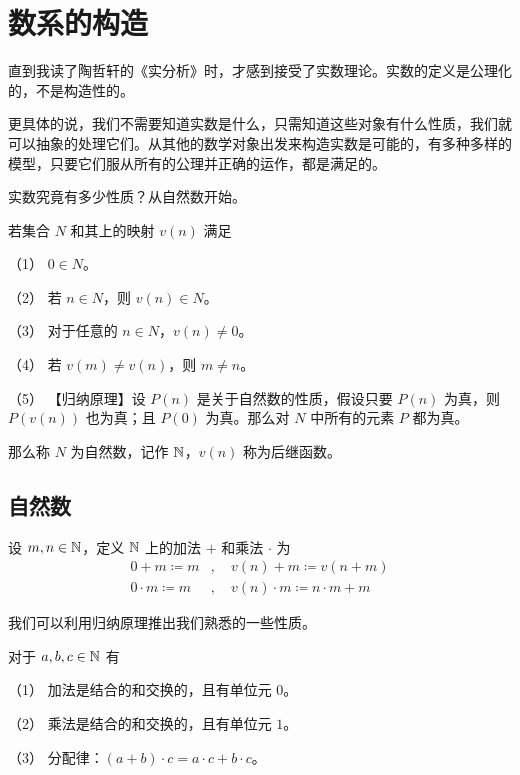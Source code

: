 \section{数系的构造}

直到我读了陶哲轩的《实分析》时，才感到接受了实数理论。实数的定义是公理化的，不是构造性的。

更具体的说，我们不需要知道实数是什么，只需知道这些对象有什么性质，我们就可以抽象的处理它们。从其他的数学对象出发来构造实数是可能的，有多种多样的模型，只要它们服从所有的公理并正确的运作，都是满足的。

实数究竟有多少性质？从自然数开始。

\begin{axiom}[Peano 公理]
	若集合 $N$ 和其上的映射 $v(n)$ 满足

	（1） $0\in N$。

	（2） 若 $n\in N$，则 $v(n) \in N$。

	（3） 对于任意的 $n\in N$，$v(n) \ne 0$。

	（4） 若 $v(m) \ne v(n)$，则 $m\ne n$。

	（5） 【归纳原理】设 $P(n)$ 是关于自然数的性质，假设只要 $P(n)$ 为真，则 $P(v(n))$ 也为真；且 $P(0)$ 为真。那么对 $N$ 中所有的元素 $P$ 都为真。

	那么称 $N$ 为自然数，记作 $\NN$，$v(n)$ 称为后继函数。
\end{axiom}

\subsection{自然数}

设 $m,n\in \mathbb{N}$，定义 $\NN$ 上的加法 $+$ 和乘法 $\cdot$ 为
\begin{equation*}
	\begin{aligned}
		0+m\coloneqq m&,\quad v(n)+m\coloneqq v(n+m)\\
		0\cdot m\coloneqq m&,\quad v(n)\cdot m\coloneqq n \cdot m + m
	\end{aligned}
\end{equation*}

我们可以利用归纳原理推出我们熟悉的一些性质。

\begin{theorem}[$\NN$ 的代数算律]
	对于 $a,b,c\in \mathbb{N}$ 有

	（1） 加法是结合的和交换的，且有单位元 $0$。

	（2） 乘法是结合的和交换的，且有单位元 $1$。

	（3） 分配律：$(a+b) \cdot  c = a \cdot c + b\cdot c$。
\end{theorem}


